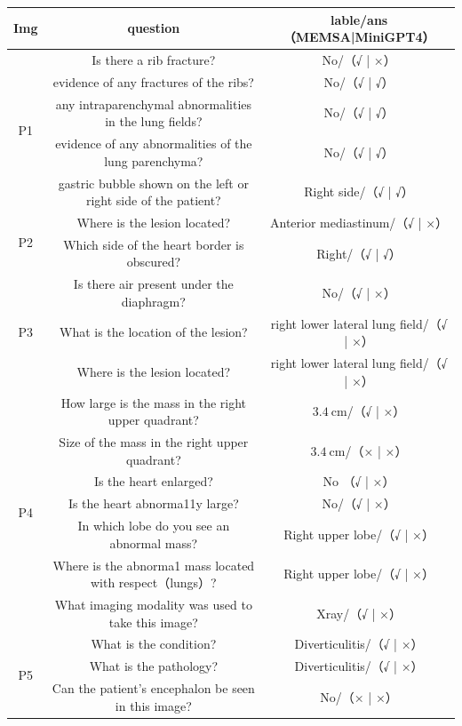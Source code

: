 \begin{table}
\begin{tabular}{|c|c|c|}
		\hline Img & question & lable/ans（MEMSA|MiniGPT4）\\
		\hline \multirow{5}{*}{ P1 } & Is there a rib fracture? & No/（√ | ×） \\
		& evidence of any fractures of the ribs? & No/（√ | √）\\
		& any intraparenchymal abnormalities in the lung fields? & No/（√ | √） \\
		& evidence of any abnormalities of the lung parenchyma? & No/（√ | √） \\
		& gastric bubble shown on the left or right side of the patient? & Right side/（√ | √） \\
		\hline \multirow{2}{*}{ P2 } & Where is the lesion located? & Anterior mediastinum/（√ | ×） \\
		& Which side of the heart border is obscured? & Right/（√ | √） \\
		\hline \multirow{3}{*}{ P3 } & Is there air present under the diaphragm? & No/（√ | ×） \\
		& What is the location of the lesion? & right lower lateral lung field/（√ | ×） \\
		& Where is the lesion located? & right lower lateral lung field/（√ | ×） \\
		\hline \multirow{7}{*}{ P4 } & How large is the mass in the right upper quadrant? & $3.4 \mathrm{~cm}$/（√ | ×） \\
		& Size of the mass in the right upper quadrant? & $3.4 \mathrm{~cm}$/（× | ×） \\
		& Is the heart enlarged? & No （√ | ×） \\
		& Is the heart abnorma11y large? & No/（√ | ×） \\
		& In which lobe do you see an abnormal mass? & Right upper lobe/（√ | ×） \\
		& Where is the abnorma1 mass located with respect（lungs）? & Right upper lobe/（√ | ×） \\
		& What imaging modality was used to take this image? & Xray/（√ | ×） \\
		\hline \multirow{3}{*}{ P5 } & What is the condition? & Diverticulitis/（√ | ×） \\
		& What is the pathology? & Diverticulitis/（√ | ×） \\
		& Can the patient's encephalon be seen in this image? & No/（× | ×） \\
		\hline
		\end{tabular}
\end{table}

